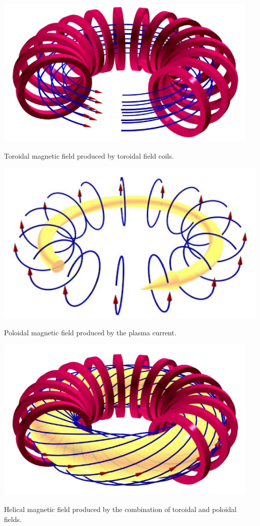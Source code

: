 \begin{marginfigure}[0cm]
	\includegraphics[width=1\linewidth]{figures/chap1/tokamak_toroidal_field}
	\caption{Toroidal magnetic field produced by toroidal field coils.}
	\label{fig:tokamak_toroidal_field}
\end{marginfigure}

\begin{marginfigure}[0cm]
	\includegraphics[width=1\linewidth]{figures/chap1/tokamak_poloidal_field}
	\caption{Poloidal magnetic field produced by the plasma current.}
	\label{fig:tokamak_poloidal_field}
\end{marginfigure}

\begin{marginfigure}[0cm]
	\includegraphics[width=1\linewidth]{figures/chap1/tokamak_helical_field}
	\caption{Helical magnetic field produced by the combination of toroidal and poloidal fields.}
	\label{fig:tokamak_helical_field}
\end{marginfigure}

